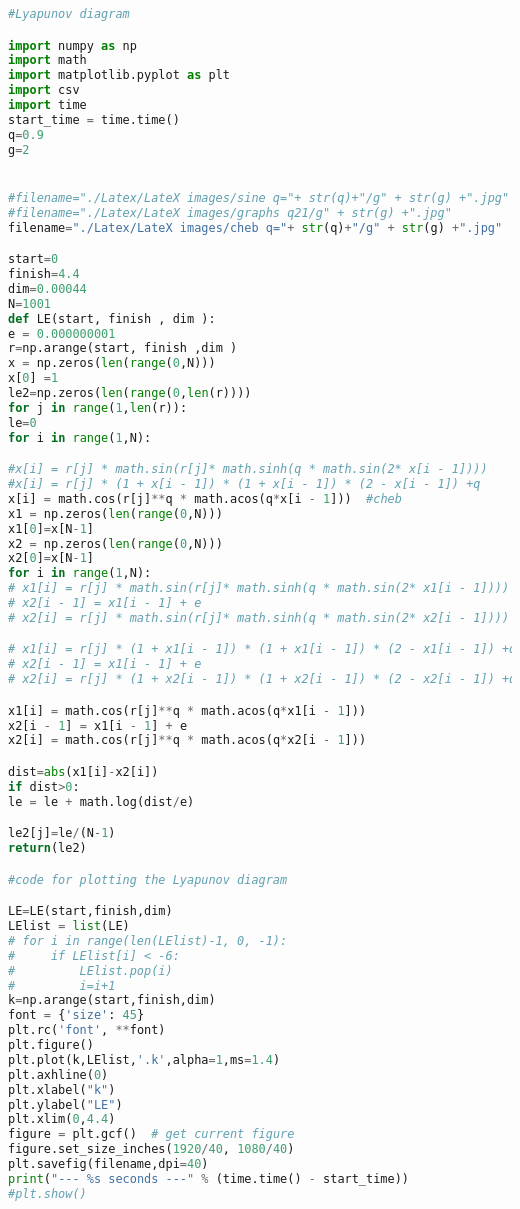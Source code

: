 \begin{lstlisting}[language=Python]
#Lyapunov diagram

import numpy as np
import math
import matplotlib.pyplot as plt
import csv
import time
start_time = time.time()
q=0.9
g=2


#filename="./Latex/LateX images/sine q="+ str(q)+"/g" + str(g) +".jpg"
#filename="./Latex/LateX images/graphs q21/g" + str(g) +".jpg"
filename="./Latex/LateX images/cheb q="+ str(q)+"/g" + str(g) +".jpg"

start=0
finish=4.4
dim=0.00044
N=1001
def LE(start, finish , dim ):
e = 0.000000001
r=np.arange(start, finish ,dim )
x = np.zeros(len(range(0,N)))
x[0] =1
le2=np.zeros(len(range(0,len(r))))
for j in range(1,len(r)):
le=0
for i in range(1,N):

#x[i] = r[j] * math.sin(r[j]* math.sinh(q * math.sin(2* x[i - 1])))
#x[i] = r[j] * (1 + x[i - 1]) * (1 + x[i - 1]) * (2 - x[i - 1]) +q
x[i] = math.cos(r[j]**q * math.acos(q*x[i - 1]))  #cheb
x1 = np.zeros(len(range(0,N)))
x1[0]=x[N-1]
x2 = np.zeros(len(range(0,N)))
x2[0]=x[N-1]
for i in range(1,N):
# x1[i] = r[j] * math.sin(r[j]* math.sinh(q * math.sin(2* x1[i - 1])))
# x2[i - 1] = x1[i - 1] + e
# x2[i] = r[j] * math.sin(r[j]* math.sinh(q * math.sin(2* x2[i - 1])))

# x1[i] = r[j] * (1 + x1[i - 1]) * (1 + x1[i - 1]) * (2 - x1[i - 1]) +q
# x2[i - 1] = x1[i - 1] + e
# x2[i] = r[j] * (1 + x2[i - 1]) * (1 + x2[i - 1]) * (2 - x2[i - 1]) +q

x1[i] = math.cos(r[j]**q * math.acos(q*x1[i - 1]))
x2[i - 1] = x1[i - 1] + e
x2[i] = math.cos(r[j]**q * math.acos(q*x2[i - 1]))

dist=abs(x1[i]-x2[i])
if dist>0:
le = le + math.log(dist/e)

le2[j]=le/(N-1)
return(le2)

#code for plotting the Lyapunov diagram

LE=LE(start,finish,dim)
LElist = list(LE)
# for i in range(len(LElist)-1, 0, -1):
#     if LElist[i] < -6:
#         LElist.pop(i)
#         i=i+1 
k=np.arange(start,finish,dim)
font = {'size': 45}
plt.rc('font', **font) 
plt.figure()
plt.plot(k,LElist,'.k',alpha=1,ms=1.4)
plt.axhline(0)
plt.xlabel("k")
plt.ylabel("LE")
plt.xlim(0,4.4)
figure = plt.gcf()  # get current figure
figure.set_size_inches(1920/40, 1080/40)
plt.savefig(filename,dpi=40)
print("--- %s seconds ---" % (time.time() - start_time))
#plt.show()



\end{lstlisting}

